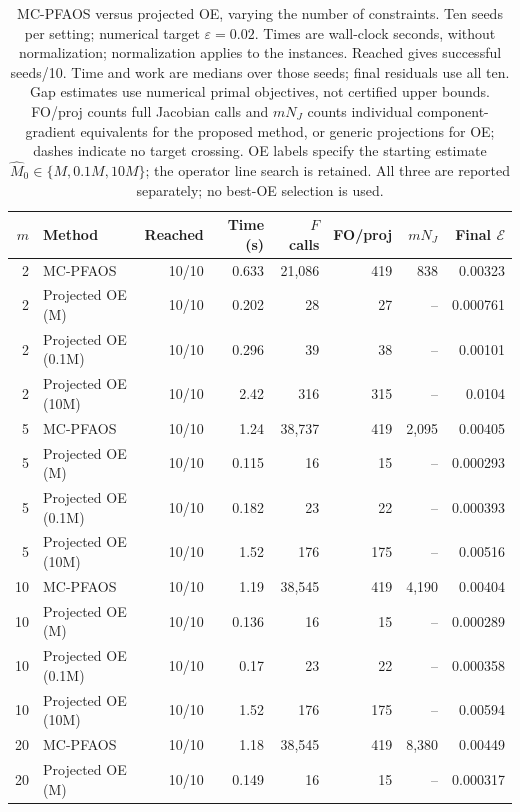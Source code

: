 \begin{table}[!htbp]
\centering\scriptsize
\caption{MC-PFAOS versus projected OE, varying the number of constraints. Ten seeds per setting; numerical target $\varepsilon=0.02$. Times are wall-clock seconds, without normalization; normalization applies to the instances. Reached gives successful seeds/10. Time and work are medians over those seeds; final residuals use all ten. Gap estimates use numerical primal objectives, not certified upper bounds. FO/proj counts full Jacobian calls and $mN_J$ counts individual component-gradient equivalents for the proposed method, or generic projections for OE; dashes indicate no target crossing. OE labels specify the starting estimate $\widehat M_0\in\{M,0.1M,10M\}$; the operator line search is retained. All three are reported separately; no best-OE selection is used.}
\label{tab:mc_pfaos_numerical}
\begin{tabular}{r l r r r r r r}
\hline
$m$ & Method & Reached & Time (s) & $F$ calls & FO/proj & $mN_J$ & Final $\mathcal E$ \\
\hline
2 & MC-PFAOS & 10/10 & 0.633 & 21,086 & 419 & 838 & 0.00323 \\
2 & Projected OE (M) & 10/10 & 0.202 & 28 & 27 & -- & 0.000761 \\
2 & Projected OE (0.1M) & 10/10 & 0.296 & 39 & 38 & -- & 0.00101 \\
2 & Projected OE (10M) & 10/10 & 2.42 & 316 & 315 & -- & 0.0104 \\
\hline
5 & MC-PFAOS & 10/10 & 1.24 & 38,737 & 419 & 2,095 & 0.00405 \\
5 & Projected OE (M) & 10/10 & 0.115 & 16 & 15 & -- & 0.000293 \\
5 & Projected OE (0.1M) & 10/10 & 0.182 & 23 & 22 & -- & 0.000393 \\
5 & Projected OE (10M) & 10/10 & 1.52 & 176 & 175 & -- & 0.00516 \\
\hline
10 & MC-PFAOS & 10/10 & 1.19 & 38,545 & 419 & 4,190 & 0.00404 \\
10 & Projected OE (M) & 10/10 & 0.136 & 16 & 15 & -- & 0.000289 \\
10 & Projected OE (0.1M) & 10/10 & 0.17 & 23 & 22 & -- & 0.000358 \\
10 & Projected OE (10M) & 10/10 & 1.52 & 176 & 175 & -- & 0.00594 \\
\hline
20 & MC-PFAOS & 10/10 & 1.18 & 38,545 & 419 & 8,380 & 0.00449 \\
20 & Projected OE (M) & 10/10 & 0.149 & 16 & 15 & -- & 0.000317 \\

\end{tabular}
\end{table}
